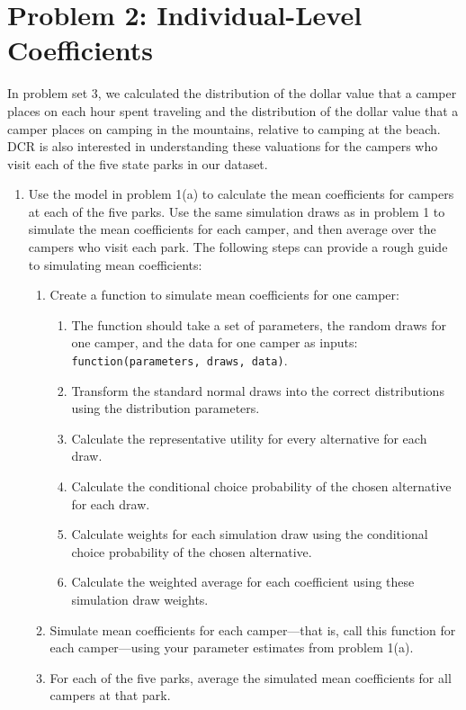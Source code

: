 \documentclass[11pt,letterpaper]{article}\usepackage[]{graphicx}\usepackage[]{color}
\begin{document}
\section*{Problem 2: Individual-Level Coefficients}

In problem set 3, we calculated the distribution of the dollar value that a camper places on each hour spent traveling and the distribution of the dollar value that a camper places on camping in the mountains, relative to camping at the beach. DCR is also interested in understanding these valuations for the campers who visit each of the five state parks in our dataset. 

\begin{enumerate}[label=\alph*., leftmargin=*]
	\item Use the model in problem 1(a) to calculate the mean coefficients for campers at each of the five parks. Use the same simulation draws as in problem 1 to simulate the mean coefficients for each camper, and then average over the campers who visit each park. The following steps can provide a rough guide to simulating mean coefficients:
	\begin{enumerate}[label=\Roman*.]
		\item Create a function to simulate mean coefficients for one camper:
		\begin{enumerate}[label=\roman*.]
			\item The function should take a set of parameters, the random draws for one camper, and the data for one camper as inputs: \texttt{function(parameters, draws, data)}.
			\item Transform the standard normal draws into the correct distributions using the distribution parameters.
			\item Calculate the representative utility for every alternative for each draw.
			\item Calculate the conditional choice probability of the chosen alternative for each draw.
			\item Calculate weights for each simulation draw using the conditional choice probability of the chosen alternative.
			\item Calculate the weighted average for each coefficient using these simulation draw weights.
		\end{enumerate}
		\item Simulate mean coefficients for each camper---that is, call this function for each camper---using your parameter estimates from problem 1(a).
		\item For each of the five parks, average the simulated mean coefficients for all campers at that park.
	\end{enumerate}


\end{enumerate}
\end{document}
